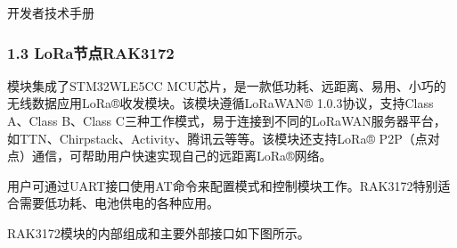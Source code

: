 \documentclass[a4paper,12pt,english]{sphinxmanual}
\begin{document}
\sphinxAtStartPar
开发者技术手册

\sphinxAtStartPar
{}


\subsubsection{1.3 LoRa节点\sphinxhyphen{}RAK3172}
\label{\detokenize{dev-board/arch:lora-rak3172}}
\sphinxAtStartPar
{}

\sphinxAtStartPar
{}模块集成了STM32WLE5CC MCU芯片，是一款低功耗、远距离、易用、小巧的无线数据应用LoRa®收发模块。该模块遵循LoRaWAN® 1.0.3协议，支持Class A、Class B、Class C三种工作模式，易于连接到不同的LoRaWAN服务器平台，如TTN、Chirpstack、Activity、腾讯云等等。该模块还支持LoRa® P2P（点对点）通信，可帮助用户快速实现自己的远距离LoRa®网络。

\sphinxAtStartPar
用户可通过UART接口使用AT命令来配置模式和控制模块工作。RAK3172特别适合需要低功耗、电池供电的各种应用。

\sphinxAtStartPar
{}

\sphinxAtStartPar
{}

\sphinxAtStartPar
{}

\sphinxAtStartPar
RAK3172模块的内部组成和主要外部接口如下图所示。

\sphinxAtStartPar
{}
\end{document}
